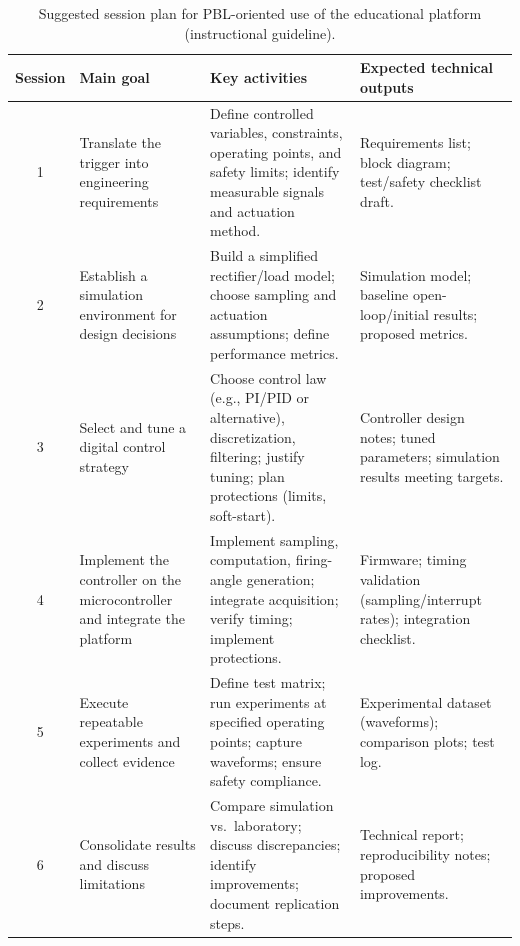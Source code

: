 \documentclass[english]{textolivre}
\begin{document}
\begin{table}[htpb]
\centering
\begin{threeparttable}
\caption{Suggested session plan for PBL-oriented use of the educational platform (instructional guideline).}
\label{tab:pbl-sessions}
\begin{tabular}{cp{3cm}p{4.4cm}p{4.3cm}}
\toprule 
Session & Main goal & Key activities & Expected technical outputs \\\midrule
1
& Translate the trigger into engineering requirements
& Define controlled variables, constraints, operating points, and safety limits; identify measurable signals and actuation method.
& Requirements list; block diagram; test/safety checklist draft. \\
2
& Establish a simulation environment for design decisions
& Build a simplified rectifier/load model; choose sampling and actuation assumptions; define performance metrics.
& Simulation model; baseline open-loop/initial results; proposed metrics. \\
3
& Select and tune a digital control strategy
& Choose control law (e.g., PI/PID or alternative), discretization, filtering; justify tuning; plan protections (limits, soft-start).
& Controller design notes; tuned parameters; simulation results meeting targets. \\
4
& Implement the controller on the microcontroller and integrate the platform
& Implement sampling, computation, firing-angle generation; integrate acquisition; verify timing; implement protections.
& Firmware; timing validation (sampling/interrupt rates); integration checklist. \\
5
& Execute repeatable experiments and collect evidence
& Define test matrix; run experiments at specified operating points; capture waveforms; ensure safety compliance.
& Experimental dataset (waveforms); comparison plots; test log. \\
6
& Consolidate results and discuss limitations
& Compare simulation vs.\ laboratory; discuss discrepancies; identify improvements; document replication steps.
& Technical report; reproducibility notes; proposed improvements. \\
\bottomrule
\end{tabular}
\end{threeparttable}
\end{table}
\end{document}
